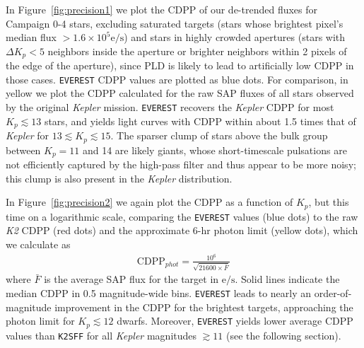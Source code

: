 \documentclass[]{emulateapj}
\begin{document}
In Figure~\ref{fig:precision1} we plot the CDPP of our de-trended fluxes for Campaign 0-4 
stars, excluding saturated targets (stars whose brightest pixel's median flux $> 1.6\times 10^5 \mathrm{e/s}$) 
and stars in highly crowded apertures (stars with $\Delta K_p < 5$ neighbors
inside the aperture or brighter neighbors within 2 pixels of the edge of the aperture),
since PLD is likely to lead to artificially low CDPP in those cases. \texttt{EVEREST}
CDPP values are plotted as blue dots. For comparison, in yellow we plot the CDPP calculated for the raw
SAP fluxes of all stars observed by the original \emph{Kepler} mission. 
\texttt{EVEREST} recovers the \emph{Kepler} CDPP for most $K_p \lesssim 13$ stars,
and yields light curves with CDPP within about 1.5 times that of \emph{Kepler}
for $13 \lesssim K_p \lesssim 15$. The sparser clump of stars above the bulk group between
$K_p = 11$ and 14 are likely giants, whose short-timescale pulsations are not efficiently
captured by the high-pass filter and thus appear to be more noisy; this clump is also
present in the \emph{Kepler} distribution.

In Figure~\ref{fig:precision2} we again plot the CDPP as a function of $K_p$, but this time
on a logarithmic scale, comparing the \texttt{EVEREST} values (blue dots) to the raw \emph{K2}
CDPP (red dots) and the approximate 6-hr photon limit (yellow dots), which we calculate as
\begin{align}
\label{eq:phot}
\mathrm{CDPP}_{phot} = \frac{10^6}{\sqrt{21600\times\bar{F}}}
\end{align}
where $\bar{F}$ is the average SAP flux for the target in $\mathrm{e/s}$. Solid lines indicate
the median CDPP in 0.5 magnitude-wide bins. \texttt{EVEREST} leads to nearly an order-of-magnitude
improvement in the CDPP for the brightest targets, approaching the photon limit for 
$K_p \lesssim 12$ dwarfs. Moreover, \texttt{EVEREST} yields lower average CDPP values than
\texttt{K2SFF} for all \emph{Kepler} magnitudes $\gtrsim 11$ (see the following section).
\end{document}
